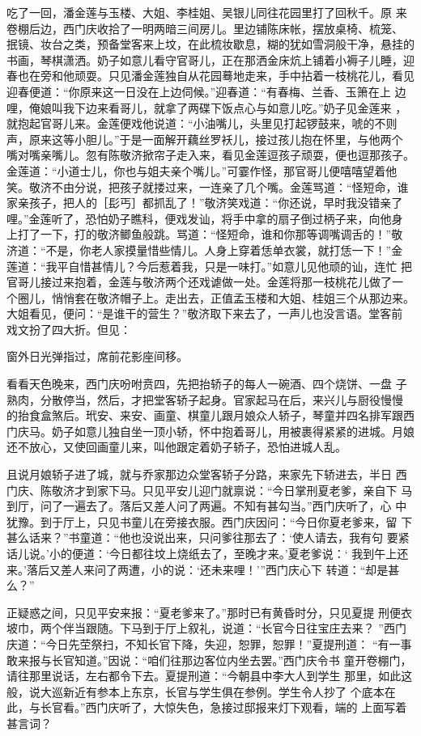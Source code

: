 吃了一回，潘金莲与玉楼、大姐、李桂姐、吴银儿同往花园里打了回秋千。原
来卷棚后边，西门庆收拾了一明两暗三间房儿。里边铺陈床帐，摆放桌椅、梳笼、
抿镜、妆台之类，预备堂客来上坟，在此梳妆歇息，糊的犹如雪洞般干净，悬挂的
书画，琴棋潇洒。奶子如意儿看守官哥儿，正在那洒金床炕上铺着小褥子儿睡，迎
春也在旁和他顽耍。只见潘金莲独自从花园蓦地走来，手中拈着一枝桃花儿，看见
迎春便道：“你原来这一日没在上边伺候。”迎春道：“有春梅、兰香、玉箫在上
边哩，俺娘叫我下边来看哥儿，就拿了两碟下饭点心与如意儿吃。”奶子见金莲来
，就抱起官哥儿来。金莲便戏他说道：“小油嘴儿，头里见打起锣鼓来，唬的不则
声，原来这等小胆儿。”于是一面解开藕丝罗袄儿，接过孩儿抱在怀里，与他两个
嘴对嘴亲嘴儿。忽有陈敬济掀帘子走入来，看见金莲逗孩子顽耍，便也逗那孩子。
金莲道：“小道士儿，你也与姐夫亲个嘴儿。”可霎作怪，那官哥儿便嘻嘻望着他
笑。敬济不由分说，把孩子就搂过来，一连亲了几个嘴。金莲骂道：“怪短命，谁
家亲孩子，把人的［髟丐］都抓乱了！”敬济笑戏道：“你还说，早时我没错亲了
哩。”金莲听了，恐怕奶子瞧科，便戏发讪，将手中拿的扇子倒过柄子来，向他身
上打了一下，打的敬济鲫鱼般跳。骂道：“怪短命，谁和你那等调嘴调舌的！”敬
济道：“不是，你老人家摸量惜些情儿。人身上穿着恁单衣裳，就打恁一下！”金
莲道：“我平自惜甚情儿？今后惹着我，只是一味打。”如意儿见他顽的讪，连忙
把官哥儿接过来抱着，金莲与敬济两个还戏谑做一处。金莲将那一枝桃花儿做了一
个圈儿，悄悄套在敬济帽子上。走出去，正值孟玉楼和大姐、桂姐三个从那边来。
大姐看见，便问：“是谁干的营生？”敬济取下来去了，一声儿也没言语。堂客前
戏文扮了四大折。但见：

窗外日光弹指过，席前花影座间移。

看看天色晚来，西门庆吩咐贲四，先把抬轿子的每人一碗酒、四个烧饼、一盘
子熟肉，分散停当，然后，才把堂客轿子起身。官家起马在后，来兴儿与厨役慢慢
的抬食盒煞后。玳安、来安、画童、棋童儿跟月娘众人轿子，琴童并四名排军跟西
门庆马。奶子如意儿独自坐一顶小轿，怀中抱着哥儿，用被裹得紧紧的进城。月娘
还不放心，又使回画童儿来，叫他跟定着奶子轿子，恐怕进城人乱。

且说月娘轿子进了城，就与乔家那边众堂客轿子分路，来家先下轿进去，半日
西门庆、陈敬济才到家下马。只见平安儿迎门就禀说：“今日掌刑夏老爹，亲自下
马到厅，问了一遍去了。落后又差人问了两遍。不知有甚勾当。”西门庆听了，心
中犹豫。到于厅上，只见书童儿在旁接衣服。西门庆因问：“今日你夏老爹来，留
下甚么话来？”书童道：“他也没说出来，只问爹往那去了：‘使人请去，我有句
要紧话儿说。’小的便道：‘今日都往坟上烧纸去了，至晚才来。’夏老爹说：‘
我到午上还来。’落后又差人来问了两遭，小的说：‘还未来哩！’”西门庆心下
转道：“却是甚么？”

正疑惑之间，只见平安来报：“夏老爹来了。”那时已有黄昏时分，只见夏提
刑便衣坡巾，两个伴当跟随。下马到于厅上叙礼，说道：“长官今日往宝庄去来？
”西门庆道：“今日先茔祭扫，不知长官下降，失迎，恕罪，恕罪！”夏提刑道：
“有一事敢来报与长官知道。”因说：“咱们往那边客位内坐去罢。”西门庆令书
童开卷棚门，请往那里说话，左右都令下去。夏提刑道：“今朝县中李大人到学生
那里，如此这般，说大巡新近有参本上东京，长官与学生俱在参例。学生令人抄了
个底本在此，与长官看。”西门庆听了，大惊失色，急接过邸报来灯下观看，端的
上面写着甚言词？

